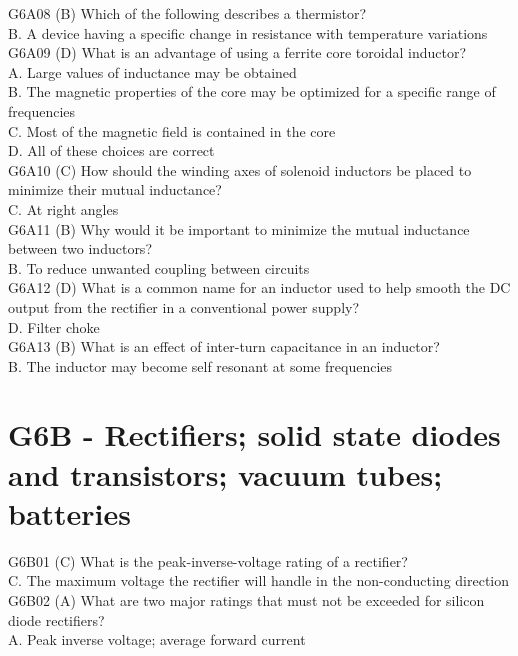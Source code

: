 \documentclass[12pt,letterpaper]{report}
\begin{document}
G6A08 (B) Which of the following describes a thermistor?\\
B. A device having a specific change in resistance with temperature variations\\

G6A09 (D) What is an advantage of using a ferrite core toroidal inductor?\\
A. Large values of inductance may be obtained\\
B. The magnetic properties of the core may be optimized for a specific range of frequencies\\
C. Most of the magnetic field is contained in the core\\
D. All of these choices are correct\\

G6A10 (C) How should the winding axes of solenoid inductors be placed to minimize their mutual inductance?\\
C. At right angles\\

G6A11 (B) Why would it be important to minimize the mutual inductance between two inductors? \\
B. To reduce unwanted coupling between circuits\\

G6A12 (D) What is a common name for an inductor used to help smooth the DC output from the rectifier in a conventional power supply?\\
D. Filter choke\\

G6A13 (B) What is an effect of inter-turn capacitance in an inductor?\\
B. The inductor may become self resonant at some frequencies\\

\section{G6B - Rectifiers; solid state diodes and transistors; vacuum tubes; batteries}

G6B01 (C) What is the peak-inverse-voltage rating of a rectifier?\\
C. The maximum voltage the rectifier will handle in the non-conducting direction\\

G6B02 (A) What are two major ratings that must not be exceeded for silicon diode rectifiers?\\
A. Peak inverse voltage; average forward current\\
\end{document}
